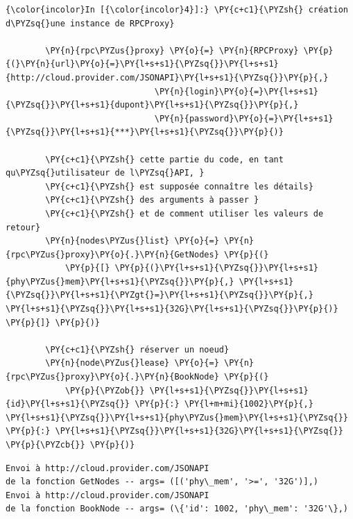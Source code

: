     \begin{Verbatim}[commandchars=\\\{\}]
{\color{incolor}In [{\color{incolor}4}]:} \PY{c+c1}{\PYZsh{} création d\PYZsq{}une instance de RPCProxy}
        
        \PY{n}{rpc\PYZus{}proxy} \PY{o}{=} \PY{n}{RPCProxy} \PY{p}{(}\PY{n}{url}\PY{o}{=}\PY{l+s+s1}{\PYZsq{}}\PY{l+s+s1}{http://cloud.provider.com/JSONAPI}\PY{l+s+s1}{\PYZsq{}}\PY{p}{,} 
                              \PY{n}{login}\PY{o}{=}\PY{l+s+s1}{\PYZsq{}}\PY{l+s+s1}{dupont}\PY{l+s+s1}{\PYZsq{}}\PY{p}{,}
                              \PY{n}{password}\PY{o}{=}\PY{l+s+s1}{\PYZsq{}}\PY{l+s+s1}{***}\PY{l+s+s1}{\PYZsq{}}\PY{p}{)}
        
        \PY{c+c1}{\PYZsh{} cette partie du code, en tant qu\PYZsq{}utilisateur de l\PYZsq{}API, }
        \PY{c+c1}{\PYZsh{} est supposée connaître les détails}
        \PY{c+c1}{\PYZsh{} des arguments à passer }
        \PY{c+c1}{\PYZsh{} et de comment utiliser les valeurs de retour}
        \PY{n}{nodes\PYZus{}list} \PY{o}{=} \PY{n}{rpc\PYZus{}proxy}\PY{o}{.}\PY{n}{GetNodes} \PY{p}{(} 
            \PY{p}{[} \PY{p}{(}\PY{l+s+s1}{\PYZsq{}}\PY{l+s+s1}{phy\PYZus{}mem}\PY{l+s+s1}{\PYZsq{}}\PY{p}{,} \PY{l+s+s1}{\PYZsq{}}\PY{l+s+s1}{\PYZgt{}=}\PY{l+s+s1}{\PYZsq{}}\PY{p}{,} \PY{l+s+s1}{\PYZsq{}}\PY{l+s+s1}{32G}\PY{l+s+s1}{\PYZsq{}}\PY{p}{)} \PY{p}{]} \PY{p}{)}
        
        \PY{c+c1}{\PYZsh{} réserver un noeud}
        \PY{n}{node\PYZus{}lease} \PY{o}{=} \PY{n}{rpc\PYZus{}proxy}\PY{o}{.}\PY{n}{BookNode} \PY{p}{(}
            \PY{p}{\PYZob{}} \PY{l+s+s1}{\PYZsq{}}\PY{l+s+s1}{id}\PY{l+s+s1}{\PYZsq{}} \PY{p}{:} \PY{l+m+mi}{1002}\PY{p}{,} \PY{l+s+s1}{\PYZsq{}}\PY{l+s+s1}{phy\PYZus{}mem}\PY{l+s+s1}{\PYZsq{}} \PY{p}{:} \PY{l+s+s1}{\PYZsq{}}\PY{l+s+s1}{32G}\PY{l+s+s1}{\PYZsq{}} \PY{p}{\PYZcb{}} \PY{p}{)}
\end{Verbatim}


    \begin{Verbatim}[commandchars=\\\{\}]
Envoi à http://cloud.provider.com/JSONAPI
de la fonction GetNodes -- args= ([('phy\_mem', '>=', '32G')],)
Envoi à http://cloud.provider.com/JSONAPI
de la fonction BookNode -- args= (\{'id': 1002, 'phy\_mem': '32G'\},)

    \end{Verbatim}
